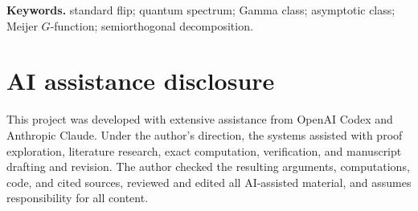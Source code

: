\documentclass[11pt]{article}
\theoremstyle{definition}
\theoremstyle{remark}
\begin{document}
\noindent\textbf{Keywords.} standard flip; quantum spectrum; Gamma class;
asymptotic class; Meijer \(G\)-function; semiorthogonal decomposition.







\section*{AI assistance disclosure}

This project was developed with extensive assistance from OpenAI Codex and
Anthropic Claude. Under the author's direction, the systems assisted with
proof exploration, literature research, exact computation, verification,
and manuscript drafting and revision. The author checked the resulting
arguments, computations, code, and cited sources, reviewed and edited all
AI-assisted material, and assumes responsibility for all content.
\end{document}
